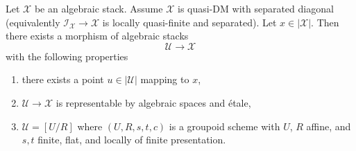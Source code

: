 \begin{lemma}
\label{lemma-etale-local-quasi-DM}
Let $\mathcal{X}$ be an algebraic stack. Assume $\mathcal{X}$ is
quasi-DM with separated diagonal (equivalently
$\mathcal{I}_\mathcal{X} \to \mathcal{X}$ is locally quasi-finite and
separated). Let $x \in |\mathcal{X}|$. Then there exists a
morphism of algebraic stacks
$$
\mathcal{U} \longrightarrow \mathcal{X}
$$
with the following properties
\begin{enumerate}
\item there exists a point $u \in |\mathcal{U}|$ mapping to $x$,
\item $\mathcal{U} \to \mathcal{X}$ is representable by algebraic spaces and
\'etale,
\item $\mathcal{U} = [U/R]$ where $(U, R, s, t, c)$ is a groupoid
scheme with $U$, $R$ affine, and $s, t$ finite, flat, and
locally of finite presentation.
\end{enumerate}
\end{lemma}

